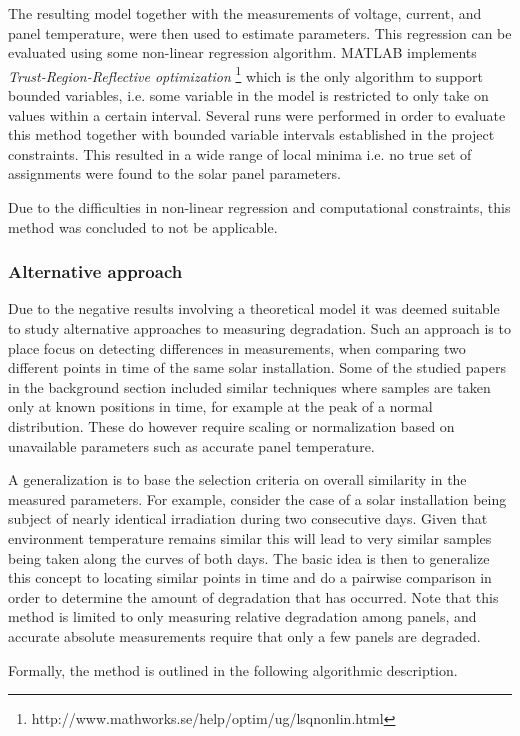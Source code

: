 The resulting model together with the measurements of voltage, current, and panel temperature, were then used to estimate parameters.
This regression can be evaluated using some non-linear regression algorithm.
MATLAB implements \emph{Trust-Region-Reflective optimization} \footnote{http://www.mathworks.se/help/optim/ug/lsqnonlin.html} which is the only algorithm to support bounded variables, i.e. some variable in the model is restricted to only take on values within a certain interval.
Several runs were performed in order to evaluate this method together with bounded variable intervals established in the project constraints.
This resulted in a wide range of local minima i.e. no true set of assignments were found to the solar panel parameters.

Due to the difficulties in non-linear regression and computational constraints, this method was concluded to not be applicable.

\subsubsection{Alternative approach}
Due to the negative results involving a theoretical model it was deemed suitable to study alternative approaches to measuring degradation.
Such an approach is to place focus on detecting differences in measurements, when comparing two different points in time of the same solar installation.
Some of the studied papers in the background section included similar techniques where samples are taken only at known positions in time, for example at the peak of a normal distribution.
These do however require scaling or normalization based on unavailable parameters such as accurate panel temperature.

A generalization is to base the selection criteria on overall similarity in the measured parameters.
For example, consider the case of a solar installation being subject of nearly identical irradiation during two consecutive days.
Given that environment temperature remains similar this will lead to very similar samples being taken along the curves of both days.
The basic idea is then to generalize this concept to locating similar points in time and do a pairwise comparison in order to determine the amount of degradation that has occurred.
Note that this method is limited to only measuring relative degradation among panels, and accurate absolute measurements require that only a few panels are degraded.

Formally, the method is outlined in the following algorithmic description.

